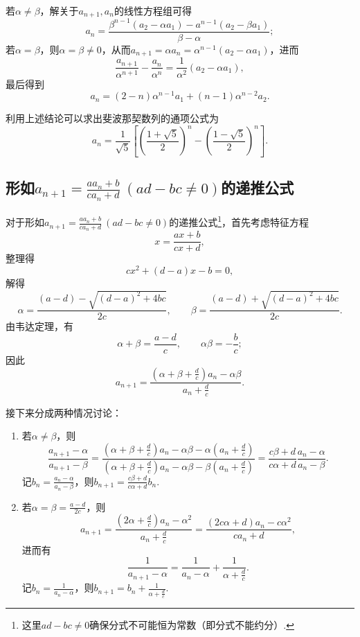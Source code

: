 若\(\alpha\neq\beta\)，解关于\(a_{n+1},a_n\)的线性方程组可得\[
a_n = \frac{\beta^{n-1} (a_2 - \alpha a_1) - a^{n-1} (a_2 - \beta a_1)}{\beta-\alpha};
\]
若\(\alpha=\beta\)，则\(\alpha=\beta\neq0\)，从而\(a_{n+1} = \alpha a_n = \alpha^{n-1} (a_2 - \alpha a_1)\)，进而\[
\frac{a_{n+1}}{\alpha^{n+1}} - \frac{a_n}{\alpha^n} = \frac{1}{\alpha^2}(a_2-\alpha a_1),
\]最后得到\[
a_n = (2-n)\alpha^{n-1} a_1 + (n-1) \alpha^{n-2} a_2.
\]

利用上述结论可以求出斐波那契数列的通项公式为\[
a_n = \frac{1}{\sqrt{5}} \left[
\left(\frac{1+\sqrt{5}}{2}\right)^n
-\left(\frac{1-\sqrt{5}}{2}\right)^n
\right].
\]

\subsection{\texorpdfstring{形如\(a_{n+1} = \frac{a a_n + b}{c a_n + d}\ (ad-bc\neq0)\)的递推公式}{第二类递推公式}}
对于形如\(a_{n+1} = \frac{a a_n + b}{c a_n + d}\ (ad-bc\neq0)\)的递推公式\footnote{这里\(ad-bc\neq0\)确保分式不可能恒为常数（即分式不能约分）.}，首先考虑特征方程\[
x = \frac{ax+b}{cx+d},
\]整理得\[
cx^2+(d-a)x-b=0,
\]解得\[
\alpha=\frac{(a-d)-\sqrt{(d-a)^2+4bc}}{2c}, \qquad
\beta=\frac{(a-d)+\sqrt{(d-a)^2+4bc}}{2c}.
\]由韦达定理，有\[
\alpha+\beta=\frac{a-d}{c}, \qquad
\alpha\beta=-\frac{b}{c};
\]因此\[
a_{n+1} = \frac{\left(\alpha+\beta+\frac{d}{c}\right) a_n - \alpha\beta}{a_n + \frac{d}{c}}.
\]

接下来分成两种情况讨论：\begin{enumerate}
\item 若\(\alpha\neq\beta\)，则\[
\frac{a_{n+1}-\alpha}{a_{n+1}-\beta}
= \frac{\left(\alpha+\beta+\frac{d}{c}\right) a_n - \alpha\beta - \alpha \left(a_n + \frac{d}{c}\right)}{\left(\alpha+\beta+\frac{d}{c}\right) a_n - \alpha\beta - \beta \left(a_n + \frac{d}{c}\right)}
= \frac{c\beta+d}{c\alpha+d} \frac{a_n-\alpha}{a_n-\beta}.
\]记\(b_n = \frac{a_n-\alpha}{a_n-\beta}\)，则\(b_{n+1} = \frac{c\beta+d}{c\alpha+d} b_n\).

\item 若\(\alpha=\beta=\frac{a-d}{2c}\)，则\[
a_{n+1} = \frac{\left(2\alpha+\frac{d}{c}\right) a_n - \alpha^2}{a_n + \frac{d}{c}}
= \frac{(2c\alpha+d)a_n-c\alpha^2}{c a_n+d},
\]进而有\[
\frac{1}{a_{n+1}-\alpha}=\frac{1}{a_n-\alpha}+\frac{1}{\alpha+\frac{d}{c}}.
\]记\(b_n = \frac{1}{a_n-\alpha}\)，则\(b_{n+1} = b_n + \frac{1}{\alpha+\frac{d}{c}}\).
\end{enumerate}

